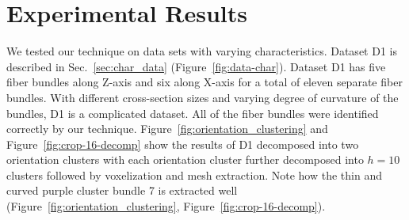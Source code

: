 \section{Experimental Results}
\label {sec:results}
We tested our technique on data sets with varying characteristics.
Dataset D1 is described in Sec.~\ref{sec:char_data} (Figure~\ref{fig:data-char}). Dataset D1 has five fiber bundles along Z-axis and six along X-axis for a total of eleven separate fiber bundles. 
With different cross-section sizes and varying degree of curvature of the bundles, D1 is a complicated dataset. All of the fiber bundles were identified correctly by our technique.
Figure~\ref{fig:orientation_clustering} and Figure~\ref{fig:crop-16-decomp} show the results of D1 decomposed into two orientation clusters with each orientation cluster further decomposed into $h=10$ clusters followed by voxelization and mesh extraction.  Note how the thin and curved purple cluster bundle 7 is extracted well (Figure~\ref{fig:orientation_clustering}, Figure~\ref{fig:crop-16-decomp}). 


